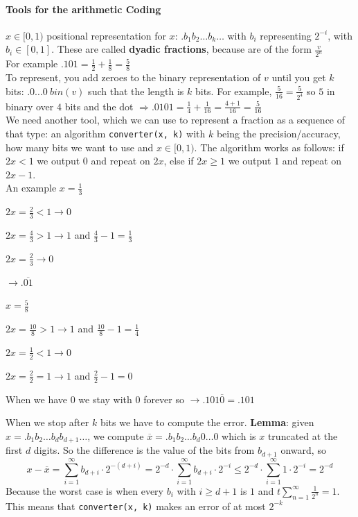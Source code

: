 \documentclass[10pt]{report}
\begin{document}
\paragraph{Tools for the arithmetic Coding}
$x\in[0,1)$ positional representation for $x$: $.b_1 b_2 \ldots b_k \ldots$ with $b_i$ representing $2^{-i}$, with $b_i\in [0,1]$. These are called \textbf{dyadic fractions}, because are of the form $\frac{v}{2^n}$\\
For example $.101 = \frac{1}{2} + \frac{1}{8} = \frac{5}{8}$\\
To represent, you add zeroes to the binary representation of $v$ until you get $k$ bits: $.0\ldots 0\:bin(v)$ such that the length is $k$ bits. For example, $\frac{5}{16} = \frac{5}{2^4}$ so $5$ in binary over $4$ bits and the dot $\Rightarrow .0101 = \frac{1}{4} + \frac{1}{16} = \frac{4+1}{16} = \frac{5}{16}$\\
We need another tool, which we can use to represent a fraction as a sequence of that type: an algorithm \texttt{converter(x, k)} with $k$ being the precision/accuracy, how many bits we want to use and $x\in[0,1)$. The algorithm works as follows: if $2x < 1$ we output $0$ and repeat on $2x$, else if $2x\geq 1$ we output $1$ and repeat on $2x-1$.\\
An example $x=\frac{1}{3}$\begin{list}{}{}
	\item $2x=\frac{2}{3} < 1 \rightarrow 0$
	\item $2x=\frac{4}{3} > 1 \rightarrow 1$ and $\frac{4}{3} - 1 = \frac{1}{3}$
	\item $2x=\frac{2}{3} \rightarrow 0$
	\item $\rightarrow .\overline{01}$
\end{list}
$x=\frac{5}{8}$\begin{list}{}{}
	\item $2x = \frac{10}{8} > 1 \rightarrow 1$ and $\frac{10}{8} - 1 = \frac{1}{4}$
	\item $2x = \frac{1}{2} < 1 \rightarrow 0$
	\item $2x = \frac{2}{2} = 1 \rightarrow 1$ and $\frac{2}{2} - 1 = 0$
	\item When we have 0 we stay with 0 forever so $\rightarrow .101\overline{0} = .101$
\end{list}
When we stop after $k$ bits we have to compute the error. \textbf{Lemma}: given $x=.b_1b_2\ldots b_d b_{d+1}\ldots$, we compute $\overline{x} = .b_1b_2\ldots b_d0\ldots0$ which is $x$ truncated at the first $d$ digits. So the difference is the value of the bits from $b_{d+1}$ onward, so $$x-\overline{x}=\sum_{i=1}^\infty b_{d+i}\cdot 2^{-(d+i)} = 2^{-d}\cdot\sum_{i=1}^\infty b_{d+i}\cdot 2^{-i}\leq 2^{-d}\cdot\sum_{i=1}^\infty 1\cdot 2^{-i} = 2^{-d}$$
Because the worst case is when every $b_i$ with $i\geq d+1$ is $1$ and $t\sum_{n=1}^\infty \frac{1}{2^n} = 1$. This means that \texttt{converter(x, k)} makes an error of at most $2^{-k}$
\end{document}
